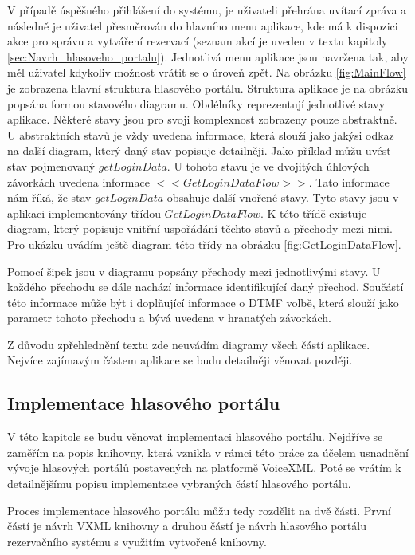 \documentclass[ing,male,java,dept460]{diploma}						%
\begin{document}
V případě úspěšného přihlášení do systému, je uživateli přehrána uvítací zpráva a následně je uživatel přesměrován do hlavního menu aplikace, kde má k dispozici akce pro správu a vytváření rezervací (seznam akcí je uveden v textu kapitoly \ref{sec:Navrh_hlasoveho_portalu}). Jednotlivá menu aplikace jsou navržena tak, aby měl uživatel kdykoliv možnost vrátit se o úroveň zpět. Na obrázku \ref{fig:MainFlow} je zobrazena hlavní struktura hlasového portálu. Struktura aplikace je na obrázku popsána formou stavového diagramu. Obdélníky reprezentují jednotlivé stavy aplikace. Některé stavy jsou pro svoji komplexnost zobrazeny pouze abstraktně. U abstraktních stavů je vždy uvedena informace, která slouží jako jakýsi odkaz na další diagram, který daný stav popisuje detailněji. Jako příklad můžu uvést stav pojmenovaný $getLoginData$. U tohoto stavu je ve dvojitých úhlových závorkách uvedena informace $<<GetLoginDataFlow>>$. Tato informace nám říká, že stav $getLoginData$ obsahuje další vnořené stavy. Tyto stavy jsou v aplikaci implementovány třídou $GetLoginDataFlow$. K této třídě existuje diagram, který popisuje vnitřní uspořádání těchto stavů a přechody mezi nimi. Pro ukázku uvádím ještě diagram této třídy na obrázku \ref{fig:GetLoginDataFlow}.


Pomocí šipek jsou v diagramu popsány přechody mezi jednotlivými stavy. U každého přechodu se dále nachází informace identifikující daný přechod. Součástí této informace může být i doplňující informace o DTMF volbě, která slouží jako parametr tohoto přechodu a bývá uvedena v hranatých závorkách.

Z důvodu zpřehlednění textu zde neuvádím diagramy všech částí aplikace. Nejvíce zajímavým částem aplikace se budu detailněji věnovat později.

\subsection{Implementace hlasového portálu}
V této kapitole se budu věnovat implementaci hlasového portálu. Nejdříve se zaměřím na popis knihovny, která vznikla v rámci této práce za účelem usnadnění vývoje hlasových portálů postavených na platformě VoiceXML. Poté se vrátím k detailnějšímu popisu implementace vybraných částí hlasového portálu.

Proces implementace hlasového portálu můžu tedy rozdělit na dvě části. První částí je návrh VXML knihovny a druhou částí je návrh hlasového portálu rezervačního systému s využitím vytvořené knihovny.
\end{document}
